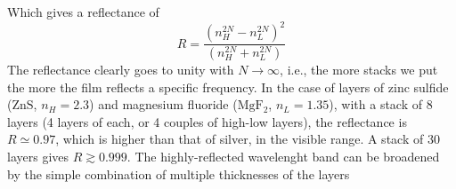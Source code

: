 \documentclass[../electromagnetism.tex]{subfiles}
\begin{document}
Which gives a reflectance of
\begin{equation}
	R=\frac{\left( n_H^{2N}-n_L^{2N} \right)^2}{\left( n_H^{2N}+n_L^{2N} \right)}
	\label{eq:reflect.hrf}
\end{equation}
The reflectance clearly goes to unity with $N\to\infty$, i.e., the more stacks we put the more the film reflects a specific frequency. In the case of layers of zinc sulfide ($\mathrm{ZnS}$, $n_H=2.3$) and magnesium fluoride ($\mathrm{MgF_2}$, $n_L=1.35$), with a stack of 8 layers (4 layers of each, or 4 couples of high-low layers), the reflectance is $R\simeq0.97$, which is higher than that of silver, in the visible range. A stack of 30 layers gives $R\gtrsim0.999$. The highly-reflected wavelenght band can be broadened by the simple combination of multiple thicknesses of the layers
\end{document}

